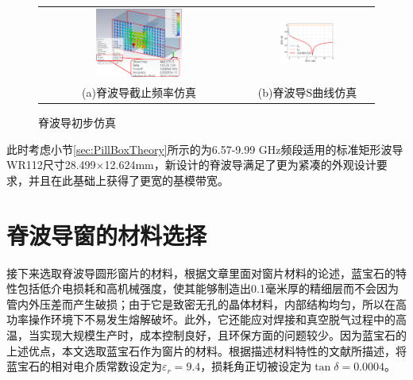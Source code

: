 \documentclass[master]{thesis-uestc}
\begin{document}
\begin{figure}[!htb]
    \small
    \centering
    \begin{tabular}{@{\ }c@{\ }c}
        \includegraphics[width=0.45\textwidth]{pic/chapter3/脊波导初步仿真.png} & 
        \hspace{5pt}
        \includegraphics[width=0.45\textwidth]{pic/chapter3/输入窗脊波导S曲线.png}     \\
        \mbox{\small (a)脊波导截止频率仿真}                                                                               & 
        \mbox{\small (b)脊波导S曲线仿真}                                                                                  \\
    \end{tabular}
    \caption{脊波导初步仿真}
    \label{fig:脊波导初步仿真}
\end{figure}

此时考虑小节\ref{sec:PillBoxTheory}所示的为6.57-9.99 GHz频段适用的标准矩形波导WR112尺寸28.499\(\times\)12.624mm，新设计的脊波导满足了更为紧凑的外观设计要求，并且在此基础上获得了更宽的基模带宽。

\section{脊波导窗的材料选择}
接下来选取脊波导圆形窗片的材料，根据文章\cite{han_sapphire_2011}里面对窗片材料的论述，蓝宝石的特性包括低介电损耗和高机械强度，使其能够制造出0.1毫米厚的精细层而不会因为管内外压差而产生破损；由于它是致密无孔的晶体材料，内部结构均匀，所以在高功率操作环境下不易发生熔解破坏。此外，它还能应对焊接和真空脱气过程中的高温，当实现大规模生产时，成本控制良好，且环保方面的问题较少。因为蓝宝石的上述优点，本文选取蓝宝石作为窗片的材料。根据描述材料特性的文献\cite{thumm_2020_State}所描述，将蓝宝石的相对电介质常数设定为$\varepsilon_r=9.4$，损耗角正切被设定为$\tan \delta = 0.0004$。
\end{document}
